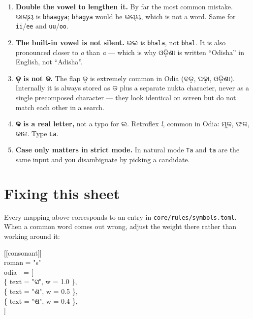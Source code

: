 \documentclass[11pt, a4paper]{article}
\newcommand{\od}[1]{{\odiafont #1}}          %
\begin{document}
\begin{enumerate}[leftmargin=1.4cm, itemsep=0.45em]
  \item \textbf{Double the vowel to lengthen it.} By far the most common mistake.
        \od{ଭାଗ୍ୟ} is \texttt{bhaagya}; \texttt{bhagya} would be \od{ଭଗ୍ୟ}, which is not a
        word. Same for \texttt{ii}/\texttt{ee} and \texttt{uu}/\texttt{oo}.

  \item \textbf{The built-in vowel is not silent.} \od{ଭଲ} is \texttt{bhala}, not
        \texttt{bhal}. It is also pronounced closer to \emph{o} than \emph{a} --- which is
        why \od{ଓଡ଼ିଶା} is written ``Odisha'' in English, not ``Adisha''.
  \item \textbf{\od{ଡ଼} is not \od{ଡ}.} The flap \od{ଡ଼} is extremely common in Odia
        (\od{ବଡ଼}, \od{ପଢ଼ା}, \od{ଓଡ଼ିଶା}). Internally it is always stored as \od{ଡ} plus a
        separate nukta character, never as a single precomposed character --- they look
        identical on screen but do not match each other in a search.
  \item \textbf{\od{ଳ} is a real letter,} not a typo for \od{ଲ}. Retroflex \emph{l},
        common in Odia: \od{ମୂଳ}, \od{ଫଳ}, \od{କାଳ}. Type \texttt{La}.
  \item \textbf{Case only matters in strict mode.} In natural mode \texttt{Ta} and
        \texttt{ta} are the same input and you disambiguate by picking a candidate.
\end{enumerate}

\section{Fixing this sheet}

Every mapping above corresponds to an entry in \texttt{core/rules/symbols.toml}. When a
common word comes out wrong, adjust the weight there rather than working around it:

\begin{center}
\begin{minipage}{0.72\textwidth}
\ttfamily\small
\color{midseapurple}[[consonant]]\color{black}\\
roman = "s"\\
odia~~= [\\
\hspace*{2em}\{ text = "\od{ସ}", w = 1.0 \},\\
\hspace*{2em}\{ text = "\od{ଶ}", w = 0.5 \},\\
\hspace*{2em}\{ text = "\od{ଷ}", w = 0.4 \},\\
]
\end{minipage}
\end{center}
\end{document}
